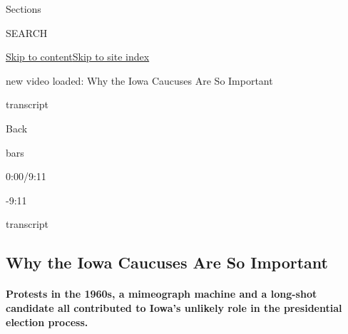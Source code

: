 Sections

SEARCH

\protect\hyperlink{site-content}{Skip to
content}\protect\hyperlink{site-index}{Skip to site index}

new video loaded: Why the Iowa Caucuses Are So Important

transcript

Back

bars

0:00/9:11

-9:11

transcript

\hypertarget{why-the-iowa-caucuses-are-so-important}{%
\subsection{Why the Iowa Caucuses Are So
Important}\label{why-the-iowa-caucuses-are-so-important}}

\hypertarget{protests-in-the-1960s-a-mimeograph-machine-and-a-long-shot-candidate-all-contributed-to-iowas-unlikely-role-in-the-presidential-election-process}{%
\paragraph{Protests in the 1960s, a mimeograph machine and a long-shot
candidate all contributed to Iowa's unlikely role in the presidential
election
process.}\label{protests-in-the-1960s-a-mimeograph-machine-and-a-long-shot-candidate-all-contributed-to-iowas-unlikely-role-in-the-presidential-election-process}}

